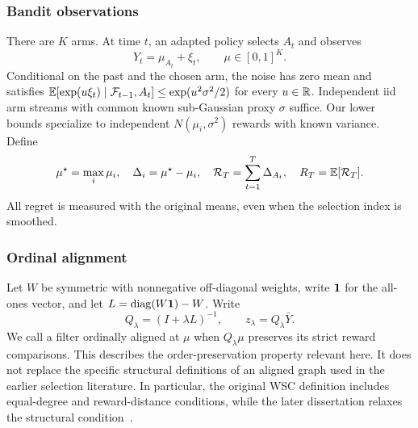 \subsubsection{Bandit observations}
There are $K$ arms. At time $t$, an adapted policy selects $A_t$ and observes
\begin{equation}
 Y_t=\mu_{A_t}+\xi_t,\qquad \mu\in[0,1]^K.
 \label{alignment_paper:eq:model}
\end{equation}
Conditional on the past and the chosen arm, the noise has zero mean and satisfies
$\mathbb E[\exp(u\xi_t)\mid\mathcal F_{t-1},A_t]\le\exp(u^2\sigma^2/2)$ for every $u\in\mathbb R$.
Independent iid arm streams with common known sub-Gaussian proxy $\sigma$ suffice. Our lower bounds specialize to independent $N(\mu_i,\sigma^2)$ rewards with known variance. Define
\begin{equation}
 \mu^\star=\max_i\mu_i,\quad \Delta_i=\mu^\star-\mu_i,
 \quad \mathcal R_T=\sum_{t=1}^T\Delta_{A_t},\quad
 R_T=\mathbb E[\mathcal R_T].
\end{equation}
All regret is measured with the original means, even when the selection index is smoothed.

\subsubsection{Ordinal alignment}
Let $W$ be symmetric with nonnegative off-diagonal weights, write $\mathbf1$ for the all-ones vector, and let
$L=\operatorname{diag}(W\mathbf1)-W$. Write
\begin{equation}
 Q_\lambda=(I+\lambda L)^{-1},\qquad z_\lambda=Q_\lambda\bar Y.
 \label{alignment_paper:eq:sindex}
\end{equation}
We call a filter ordinally aligned at $\mu$ when $Q_\lambda\mu$ preserves its strict reward comparisons. This describes the order-preservation property relevant here. It does not replace the specific structural definitions of an aligned graph used in the earlier selection literature. In particular, the original WSC definition includes equal-degree and reward-distance conditions, while the later dissertation relaxes the structural condition~\cite{collected14,collected16}.

